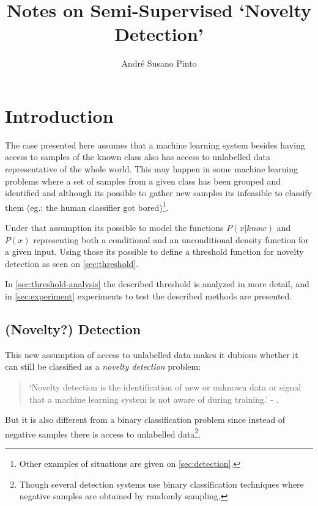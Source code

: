 \documentclass[a4paper]{article}
\title{Notes on Semi-Supervised `Novelty Detection'}
\author{André Susano Pinto}
\begin{document}
\maketitle

\section{Introduction}
The case presented here assumes that a machine learning system besides having access to samples of the known class also has access to unlabelled data representative of the whole world.
This may happen in some machine learning problems where a set of samples from a given class has been grouped and identified and although its possible to gather new samples its infeasible to classify them (eg.: the human classifier got bored)\footnote{Other examples of situations are given on \autoref{sec:detection}.}.

Under that assumption its possible to model the functions $P(x|know)$ and $P(x)$ representing both a conditional and an unconditional density function for a given input.
Using those its possible to define a threshold function for novelty detection as seen on \autoref{sec:threshold}.

In \autoref{sec:threshold-analysis} the described threshold is analyzed in more detail, and in \autoref{sec:experiment} experiments to test the described methods are presented.

\subsection{(Novelty?) Detection}

This new assumption of access to unlabelled data makes it dubious whether it can still be classified as a \emph{novelty detection} problem:
\begin{quotation}
`Novelty detection is the identification of new or unknown data or signal that a machine learning system is not aware of during training.' - \cite{markou2003novelty}.
\end{quotation}

But it is also different from a binary classification problem since instead of negative samples there is access to unlabelled data\footnote{Though several detection systems use binary classification techniques where negative samples are obtained by randomly sampling.}.
\end{document}
